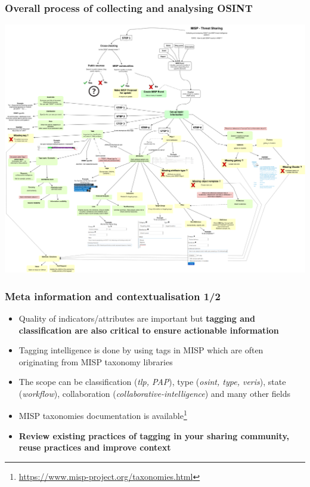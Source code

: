 \begin{frame}
        \frametitle{Overall process of collecting and analysing OSINT}
        \includegraphics[scale=0.17]{OSINT_MISP_almostcomplete.png}
\end{frame}

\begin{frame}
\frametitle{Meta information and contextualisation 1/2}
\begin{itemize}
\item Quality of indicators/attributes are important but {\bf tagging and classification are also critical to ensure actionable information}
        \item Tagging intelligence is done by using tags in MISP which are often originating from MISP taxonomy libraries
        \item The scope can be classification ({\it tlp, PAP}), type ({\it osint, type, veris}), state ({\it workflow}), collaboration ({\it collaborative-intelligence}) and many other fields
        \item MISP taxonomies documentation is available\footnote{\url{https://www.misp-project.org/taxonomies.html}}
        \item {\bf Review existing practices of tagging in your sharing community, reuse practices and improve context}
\end{itemize}
\end{frame}

